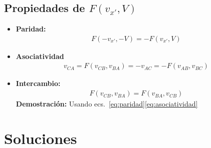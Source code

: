 \subsection{Propiedades de $F(v_{x'},V)$}
\begin{frame}
\begin{itemize}
\item \textbf{Paridad:}
  \begin{align}
    \label{eq:paridad}
    F(-v_{x'},-V)=-F(v_{x'},V)
  \end{align}
\item \textbf{Asociatividad}
  \begin{align}
    \label{eq:asociatividad}
    v_{CA}=F(v_{CB},v_{BA})=-v_{AC}=-F(v_{AB},v_{BC})
  \end{align}
\item \textbf{Intercambio:}
  \begin{align}
    \label{eq:intercambio}
    F(v_{CB},v_{BA})=F(v_{BA},v_{CB})
  \end{align}
\textbf{Demostración:} Usando ecs.~\eqref{eq:paridad}\eqref{eq:asociatividad}

\end{itemize}
\end{frame}
\section{Soluciones}

